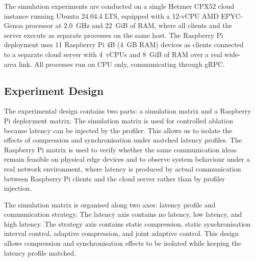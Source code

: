 \documentclass[conference]{IEEEtran}
\begin{document}
The simulation experiments are conducted on a single Hetzner CPX52 cloud instance running Ubuntu 24.04.4 LTS, equipped with a 12-vCPU AMD EPYC-Genoa processor at 2.0~GHz and 22~GiB of RAM, where all clients and the server execute as separate processes on the same host. The Raspberry Pi deployment uses 11 Raspberry Pi 4B (4~GB RAM) devices as clients connected to a separate cloud server with 4~vCPUs and 8~GiB of RAM over a real wide-area link. All processes run on CPU only, communicating through gRPC.

\subsection{Experiment Design}
\label{subsec:experiment_design}

The experimental design contains two parts: a simulation matrix and a Raspberry Pi deployment matrix. The simulation matrix is used for controlled ablation because latency can be injected by the profiler. This allows us to isolate the effects of compression and synchronisation under matched latency profiles. The Raspberry Pi matrix is used to verify whether the same communication ideas remain feasible on physical edge devices and to observe system behaviour under a real network environment, where latency is produced by actual communication between Raspberry Pi clients and the cloud server rather than by profiler injection.

The simulation matrix is organised along two axes: latency profile and communication strategy. The latency axis contains no latency, low latency, and high latency. The strategy axis contains static compression, static synchronisation interval control, adaptive compression, and joint adaptive control. This design allows compression and synchronisation effects to be isolated while keeping the latency profile matched.

\begin{table}[H]
\centering
\caption{Communication strategy definitions.}
\label{tab:strategy_definitions}
\end{table}
\end{document}
